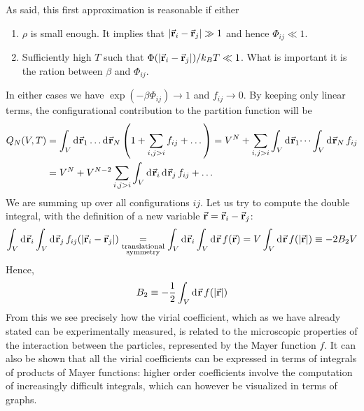 \documentclass[../main/main.tex]{subfiles}
\begin{document}

As said, this first approximation is reasonable if either
\begin{enumerate}
\item \( \rho  \) is small enough. It implies that \( \abs{\va{r}_i - \va{r}_j} \gg 1 \) and hence \( \Phi _{ij} \ll 1 \).
\item Sufficiently high \( T \) such that \( \Phi (\abs{\va{r}_i - \va{r}_j} )/k_B T \ll 1 \). What is important it is the ration between \( \beta  \)  and \( \Phi _{ij} \).
\end{enumerate}
In either cases we have \( \exp (- \beta \Phi _{ij}) \rightarrow 1 \) and \( f_{ij} \rightarrow 0 \). By keeping only linear terms,  the configurational contribution to the partition function will be
\begin{equation*}
\begin{split}
  Q_N (V,T) &= \int_{V}^{} \dd[]{\va{r}_1} \dots \dd[]{\va{r}_N} \qty(1+ \sum_{i,j>i}^{} f_{ij} + \dots )
  = V^N + \sum_{i,j>i}^{} \int_{V}^{} \dd[]{\va{r}_1} \dots \int_{V}^{}  \dd[]{\va{r}_N} f_{ij} \\
  &= V^N + V^{N-2} \sum_{i,j>i}^{} \int_{V}^{} \dd[]{\va{r}_i} \dd[]{\va{r}_j} f_{ij} + \dots \\
\end{split}
\end{equation*}
We are summing up over all configurations \( ij \). Let us try to compute the double integral, with the definition of a new variable \( \va{r} = \va{r}_i - \va{r}_j \):
\begin{equation*}
  \int_{V}^{} \dd[]{\va{r}_i} \int_{V}^{} \dd[]{\va{r}_j} f_{ij} (\abs{\va{r}_i - \va{r}_j} ) \underset{\substack{ \text{translational} \\  \text{symmetry} } }{=}  \int_{V}^{} \dd[]{\va{r}_i} \int_{V}^{}  \dd[]{\va{r}} f (\va{r})
  = V \int_{V}^{} \dd[]{\va{r}}  f \qty(\abs{\va{r}} ) \equiv -2 B_2 V
\end{equation*}
Hence,
\begin{equation}
  B_2 \equiv - \frac{1}{2} \int_{V}^{} \dd[]{\va{r}}  f \qty(\abs{\va{r}} )
\end{equation}
From this we see precisely how the virial coefficient, which as we have already stated can be experimentally measured, is related to the microscopic properties of the interaction between the particles, represented by the Mayer function \( f \). It can also be shown that all the virial coefficients can be expressed in terms of integrals of products of Mayer functions: higher order coefficients involve the computation of increasingly difficult integrals, which can however be visualized in terms of graphs.
\end{document}
